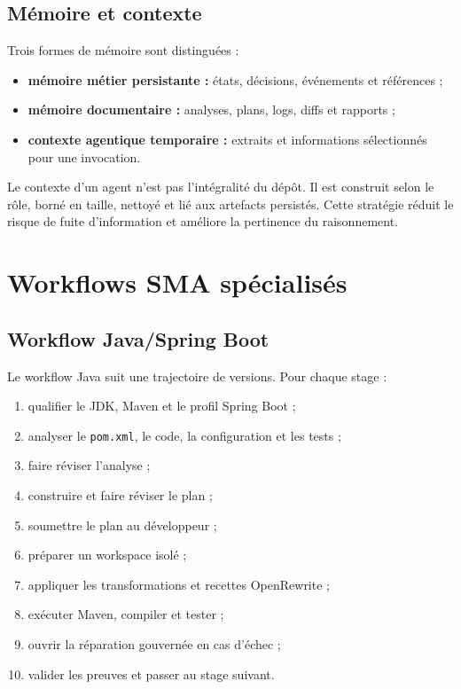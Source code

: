 \subsection{Mémoire et contexte}

Trois formes de mémoire sont distinguées :

\begin{itemize}
    \item \textbf{mémoire métier persistante :} états, décisions, événements et références ;
    \item \textbf{mémoire documentaire :} analyses, plans, logs, diffs et rapports ;
    \item \textbf{contexte agentique temporaire :} extraits et informations sélectionnés pour une invocation.
\end{itemize}

Le contexte d'un agent n'est pas l'intégralité du dépôt. Il est construit selon le rôle, borné en taille, nettoyé et lié aux artefacts persistés. Cette stratégie réduit le risque de fuite d'information et améliore la pertinence du raisonnement.

\section{Workflows SMA spécialisés}

\subsection{Workflow Java/Spring Boot}

Le workflow Java suit une trajectoire de versions. Pour chaque stage :

\begin{enumerate}
    \item qualifier le JDK, Maven et le profil Spring Boot ;
    \item analyser le \texttt{pom.xml}, le code, la configuration et les tests ;
    \item faire réviser l'analyse ;
    \item construire et faire réviser le plan ;
    \item soumettre le plan au développeur ;
    \item préparer un workspace isolé ;
    \item appliquer les transformations et recettes OpenRewrite ;
    \item exécuter Maven, compiler et tester ;
    \item ouvrir la réparation gouvernée en cas d'échec ;
    \item valider les preuves et passer au stage suivant.
\end{enumerate}

